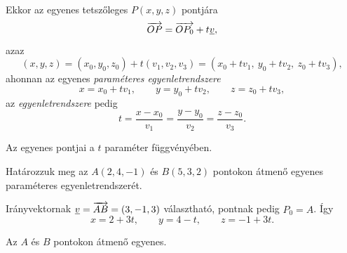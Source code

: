 \documentclass[11pt]{article}
\begin{document}
\noindent Ekkor az egyenes tetszőleges $P(x, y, z)$ pontjára
\[
\overrightarrow{OP}=\overrightarrow{OP_{0}}+t\underline{v},
\]
azaz
\[
(x, y, z)=(x_{0}, y_{0}, z_{0})+t(v_{1}, v_{2}, v_{3})=(x_{0}+tv_{1},\ y_{0}+tv_{2},\ z_{0}+tv_{3}),
\]
ahonnan az egyenes \emph{paraméteres egyenletrendszere}
\begin{equation}\label{eq:parameteres}
x=x_{0}+tv_{1},\qquad y=y_{0}+tv_{2},\qquad z=z_{0}+tv_{3},
\end{equation}
az \emph{egyenletrendszere} pedig
\begin{equation}\label{eq:egyenletrendszer}
t=\frac{x-x_{0}}{v_{1}}=\frac{y-y_{0}}{v_{2}}=\frac{z-z_{0}}{v_{3}}.
\end{equation}

\begin{notefig}{Az egyenes pontjai a $t$ paraméter függvényében.}
\end{notefig}

\begin{exbox}
\begin{example}
Határozzuk meg az $A(2, 4, -1)$ és $B(5, 3, 2)$ pontokon átmenő egyenes paraméteres egyenletrendszerét.
\end{example}
\end{exbox}
\begin{solution}
Irányvektornak $\underline{v}=\overrightarrow{AB}=(3, -1, 3)$ választható, pontnak pedig $P_{0}=A$. Így
\[
x=2+3t,\qquad y=4-t,\qquad z=-1+3t .
\]

\begin{notefig}{Az $A$ és $B$ pontokon átmenő egyenes.}
\end{notefig}
\end{solution}
\end{document}
